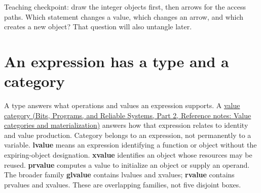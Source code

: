 Teaching checkpoint: draw the integer objects first, then arrows for the access paths. Which statement changes a value, which changes an arrow, and which creates a new object? That question will also untangle  later.

\section{An expression has a type and a category}\label{05-engine-i-ch003-an-expression-has-a-type-and-a-category}

\hypertarget{05-engine-i-ch003-an-expression-has-a-type-and-a-category}{}

A type answers what operations and values an expression supports. A \href{../01-Bits-Programs-and-Reliable-Systems-P02/main.pdf\#nameddest=appendix-1121b30eaeb0}{value category (Bits, Programs, and Reliable Systems, Part 2, Reference notes: Value categories and materialization)} answers how that expression relates to identity and value production. Category belongs to an expression, not permanently to a variable. \textbf{lvalue} means an expression identifying a function or object without the expiring-object designation. \textbf{xvalue} identifies an object whose resources may be reused. \textbf{prvalue} computes a value to initialize an object or supply an operand. The broader family \textbf{glvalue} contains lvalues and xvalues; \textbf{rvalue} contains prvalues and xvalues. These are overlapping families, not five disjoint boxes.

